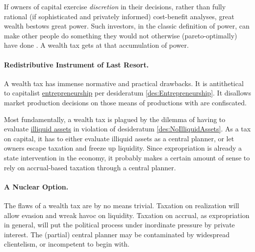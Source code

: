 If owners of capital exercise \emph{discretion} in their decisions, rather than fully rational (if sophisticated and privately informed) cost-benefit analyses, great wealth bestows great power.
Such investors, in the classic definition of power, can make other people do something they would not otherwise (pareto-optimally) have done \citep[8ff]{Geoff2002}.
A wealth tax gets at that accumulation of power.

\paragraph{Redistributive Instrument of Last Resort.} A wealth tax has immense normative and practical drawbacks.
It is antithetical to capitalist \hyperref[des:Entrepreneurship]{entrepreneurship} per desideratum \ref{des:Entrepreneurship}.
It disallows market production decisions on those means of productions with are confiscated.

Most fundamentally, a wealth tax is plagued by the dilemma of having to evaluate \hyperref[des:NoIlliquidAssets]{illiquid assets} in violation of desideratum \ref{des:NoIlliquidAssets}.
As a tax on capital, it has to either evaluate illiquid assets as a central planner, or let owners escape taxation and freeze up liquidity.
Since expropriation is already a state intervention in the economy, it probably makes a certain amount of sense to rely on accrual-based taxation through a central planner.

\paragraph{A Nuclear Option.} The flaws of a wealth tax are by no means trivial.
Taxation on realization will allow evasion and wreak havoc on liquidity.
Taxation on accrual, as expropriation in general, will put the political process under inordinate pressure by private interest.
The (partial) central planner may be contaminated by widespread clientelism, or incompetent to begin with.

